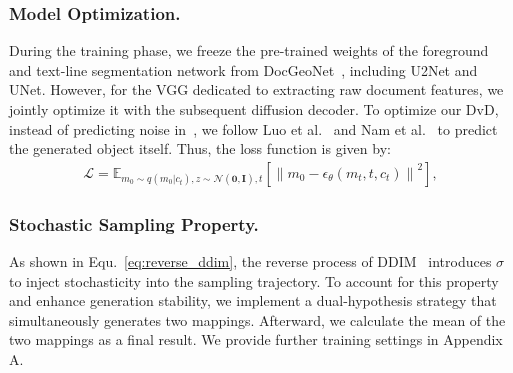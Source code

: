 \subsubsection{Model Optimization.} During the training phase, we freeze the pre-trained weights of the foreground and text-line segmentation network from DocGeoNet~\cite{Feng2022geodocnet}, including U2Net and UNet. However, for the VGG dedicated to extracting raw document features, we jointly optimize it with the subsequent diffusion decoder. To optimize our DvD, instead of predicting noise in~\cite{ho_2020_ddpm}, we follow Luo et al.~\citeyearpar{luo2024flowdiffuser} and Nam et al.~\citeyearpar{nam_2024_diffmatch} to predict the generated object itself. Thus, the loss function is given by:
\begin{equation}
\begin{split}
\label{eq:loss}
\mathcal{L}=\mathbb{E}_{m_0\sim q(m_0|c_t), z \sim \mathcal{N}(\mathbf{0}, \mathbf{I}),t}\left[\left\|m_0-\mathcal{\epsilon}_\theta\left(m_t, t, c_t\right)\right\|^2\right],
\end{split}
\end{equation}


\subsubsection{Stochastic Sampling Property.} 
As shown in Equ.~\ref{eq:reverse_ddim}, the reverse process of DDIM~\cite{Alexander_2020_ddim} introduces $\sigma$ to inject stochasticity into the sampling trajectory. To account for this property and enhance generation stability, we implement a dual-hypothesis strategy that simultaneously generates two mappings. Afterward, we calculate the mean of the two mappings as a final result. We provide further training settings in Appendix A.



